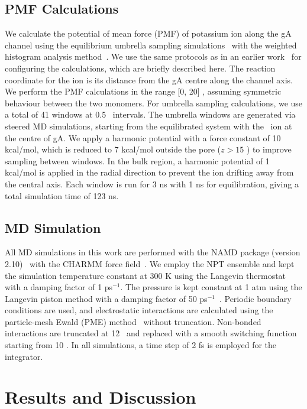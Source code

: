 \subsection{PMF Calculations}
We calculate the potential of mean force (PMF) of potassium ion along the gA channel using the
equilibrium umbrella sampling simulations~\cite{Torrie1977} with the weighted histogram analysis 
method~\cite{Kumar1992}. We use the same protocols as in an earlier work~\cite{Bastug2007} for 
configuring the calculations, which are briefly described here. The reaction coordinate for the 
ion is its distance from the gA centre along the channel axis. We perform the PMF calculations in 
the range [0, 20] \angs, assuming symmetric behaviour between the two monomers. For umbrella sampling 
calculations, we use a total of 41 windows at 0.5 \angs\ intervals. The umbrella windows are 
generated via steered MD simulations, starting from the equilibrated system with the \K\ ion at the 
centre of gA. We apply a harmonic potential with a force constant of 10 kcal/mol, which is reduced 
to 7 kcal/mol outside the pore ($z > 15$ \angs) to improve sampling between windows. In the bulk 
region, a harmonic potential of 1 kcal/mol is applied in the radial direction to prevent the ion 
drifting away from the central axis. Each window is run for 3 ns with 1 ns for equilibration, giving 
a total simulation time of 123 ns.

\subsection{MD Simulation}
All MD simulations in this work are performed with the NAMD package (version 2.10)~\cite{Phillips2005} 
with the CHARMM force field~\cite{Brooks2009}. We employ the NPT ensemble and kept the simulation 
temperature constant at 300 K using the Langevin thermostat with a damping factor of 1 ps$^{-1}$. 
The pressure is kept constant at 1 atm using the Langevin piston method with a damping factor of 
50 ps$^{-1}$~\cite{Feller1995}. Periodic boundary conditions are used, and electrostatic interactions 
are calculated using the particle-mesh Ewald (PME) method~\cite{Darden1993} without truncation. 
Non-bonded interactions are truncated at 12 \angs\ and replaced with a smooth switching function 
starting from 10 \angs. In all simulations, a time step of 2 fs is employed for the integrator.

\section{Results and Discussion}
